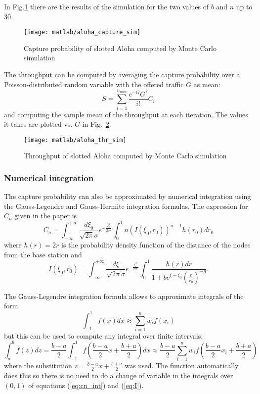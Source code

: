 \documentclass[a4paper,oneside]{article}
\begin{document}
In Fig.\ref{plot:aloha_capture_sim} there are the results of the
simulation for the two values of $b$ and $n$ up to 30.
\begin{figure}[htbp]
  \centering
  \texttt{[image: matlab/aloha\_capture\_sim]}
  \caption{Capture probability of slotted Aloha computed by Monte
    Carlo simulation}
  \label{plot:aloha_capture_sim}
\end{figure}

The throughput can be computed by averaging the capture probability
over a Poisson-distributed random variable with the offered traffic
$G$ as mean:
\begin{equation}
  S = \sum_{i=1}^{n_{max}} \frac{e^{-G} G^i}{i!} C_i
\end{equation}
and computing the sample mean of the throughput at each iteration.
The values it takes are plotted vs. $G$ in
Fig.~\ref{plot:aloha_thr_sim}.
\begin{figure}[htbp]
  \centering
  \texttt{[image: matlab/aloha\_thr\_sim]}
  \caption{Throughput of slotted Aloha computed by Monte Carlo
    simulation}
  \label{plot:aloha_thr_sim}
\end{figure}

\subsubsection*{Numerical integration}
The capture probability can also be approximated by numerical
integration using the Gauss-Legendre and Gauss-Hermite integration
formulas. The expression for $C_n$ given in the paper is
\begin{equation}
  C_n = \int_{-\infty}^{+\infty} \frac{d\xi_0}{\sqrt{2\pi}\sigma} e^{-\frac{\xi_0^2}{2\sigma^2}}
  \int_0^1 n\left( I(\xi_0, r_0) \right)^{n-1} h(r_0)dr_0
  \label{eq:cn_int}
\end{equation}
where $h(r) = 2r$ is the probability density function of the distance of
the nodes from the base station and
\begin{equation}
  I(\xi_0, r_0) = \int_{-\infty}^{+\infty} \frac{d\xi}{\sqrt{2\pi}\sigma} e^{-\frac{\xi^2}{2\sigma^2}}
  \int_0^1 \frac{h(r)dr}{1 + be^{\xi - \xi_0}\left( \frac{r}{r_0} \right)^{-\eta}} .
  \label{eq:I}
\end{equation}

The Gauss-Legendre integration formula allows to approximate integrals
of the form
\begin{equation}
  \int_{-1}^1 f(x) dx \approx \sum_{i=1}^n w_i f(x_i)
\end{equation}
but this can be used to compute any integral over finite intervals:
\begin{equation}
  \int_a^b f(z) dz = \frac{b-a}{2}\int_{-1}^1 f\left( \frac{b-a}{2} x + \frac{b+a}{2} \right) dx \approx \frac{b-a}{2} \sum_{i=1}^n w_i f\left( \frac{b-a}{2} x_i + \frac{b+a}{2} \right)
\end{equation}
where the substitution $z = \frac{b-a}{2} x + \frac{b+a}{2}$ was used.
The function  automatically does this so there is
no need to do a change of variable in the integrals over $(0,1)$ of
equations (\ref{eq:cn_int}) and (\ref{eq:I}).
\end{document}
